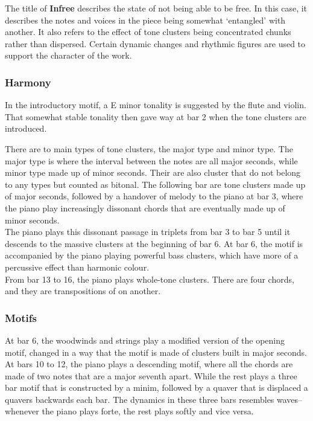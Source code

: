 \documentclass{article}
\begin{document}
The title of \textbf{Infree} describes the state of not being able to be free.
In this case, it describes the notes and voices in the piece being somewhat
`entangled' with another. It also refers to the effect of tone clusters being
concentrated chunks rather than dispersed. Certain dynamic changes and rhythmic
figures are used to support the character of the work.\\

\subsubsection{Harmony}

In the introductory motif, a E minor tonality is suggested by the flute and
violin.  That somewhat stable tonality then gave way at bar 2 when
the tone clusters are introduced.

There are to main types of tone clusters, the major type and minor type.  The
major type is where the interval between the notes are all major seconds, while
minor type made up of minor seconds. Their are also cluster that do not belong
to any types but counted as bitonal. The following bar are tone clusters made
up of major seconds, followed by a handover of melody to the piano at bar 3,
where the piano play increasingly dissonant chords that are eventually made up
of minor seconds.\\

The piano plays this dissonant passage in triplets from bar 3 to bar 5 until it
descends to the massive clusters at the beginning of bar 6.  At bar 6, the
motif is accompanied by the piano playing powerful bass clusters, which have
more of a percussive effect than harmonic colour.\\

From bar 13 to 16, the piano plays whole-tone clusters. There are four chords,
and they are transpositions of on another.

\subsubsection{Motifs}

At bar 6, the woodwinds and strings play a modified version of the opening
motif, changed in a way that the motif is made of clusters built in major
seconds.  At bars 10 to 12, the piano plays a descending motif, where all the
chords are made of two notes that are a major seventh apart.  While the rest
plays a three bar motif that is constructed by a minim, followed by a quaver
that is displaced a quavers backwards each bar.  The dynamics in these three bars
resembles waves--whenever the piano plays forte, the rest plays softly and vice
versa.\\
\end{document}
